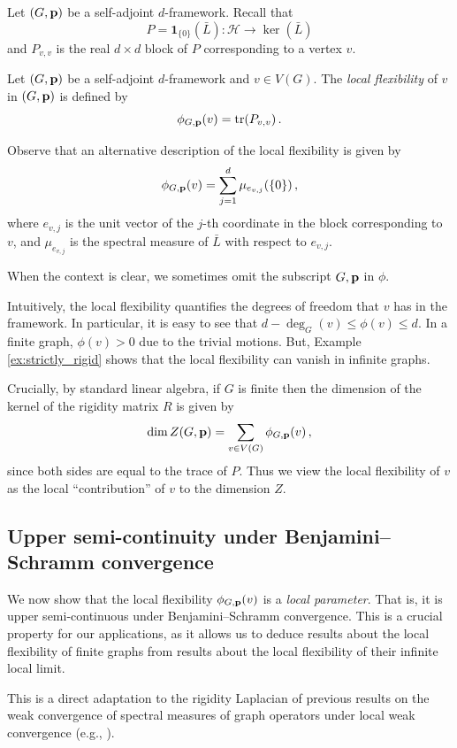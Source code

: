 \documentclass[reqno,english]{amsart}
\numberwithin{equation}{section}
\theoremstyle{definition}{
\newtheorem{example}[theorem]{Example}
\newtheorem{definition}[theorem]{Definition}
\newtheorem*{definition*}{Definition}
\newtheorem{problem}[theorem]{Problem}
\newtheorem{question}[theorem]{Question}
}
\newcommand{\cH}{\mathcal H}
\newcommand{\p}{{\bf p}}
\newcommand{\tr}{{\mathrm {tr}}}
\begin{document}
Let $(G,\p)$ be a self-adjoint $d$-framework. 
Recall that 
    \[
    P=\mathbf 1_{\{0\}}(\bar L):\cH\to \ker(\bar L)
    \]
    and $P_{v,v}$ is the real $d\times d$ block of $P$ corresponding to a vertex $v$. 
\begin{definition}
Let $(G,\p)$ be a self-adjoint $d$-framework and $v\in V(G)$. The {\em local flexibility} of $v$ in $(G,\p)$ is defined by
    \[
    \phi_{G,\p}(v)=\tr(P_{v,v})\,.
    \]
\end{definition}
Observe that an alternative description of the local flexibility is given by
\[
\phi_{G,\p}(v) = \sum_{j=1}^d \mu_{e_{v,j}}(\{0\})\,,
\]
where $e_{v,j}$ is the unit vector of the $j$-th coordinate in the block corresponding to $v$, and $\mu_{e_{v,j}}$ is the spectral measure of $\bar L$ with respect to $e_{v,j}$.

When the context is clear, we sometimes omit the subscript $G,\p$ in $\phi$.

Intuitively, the local flexibility quantifies the degrees of freedom that $v$ has in the framework. 
In particular, it is easy to see that $d-\deg_G(v)\le \phi (v)\le d$. In a finite graph, $\phi(v)>0$ due to the trivial motions. 
But, Example \ref{ex:strictly_rigid} shows that the local flexibility can vanish in infinite graphs.


Crucially, by standard linear algebra, if $G$ is finite then the dimension of the kernel of the rigidity matrix $R$ is given by
\begin{equation}\label{eq:dimZ_local}
\dim Z(G,\p) = \sum_{v\in V(G)} \phi_{G,\p}(v)\,,
\end{equation}
since both sides are equal to the trace of $P$. Thus we  view the local flexibility of $v$ as the local ``contribution'' of $v$ to the dimension $Z$.

\subsection{Upper semi-continuity under Benjamini--Schramm convergence}
We now show that the local flexibility $\phi_{G,\p}(v)$ is a {\em local parameter}. That is, it is upper semi-continuous 
under Benjamini--Schramm convergence. This is a crucial property for our applications, as it allows us to deduce results about the local flexibility of finite graphs from results about the local flexibility of their infinite local limit.

This is a direct adaptation to the rigidity Laplacian of previous results on the weak convergence of spectral measures of graph operators under local weak convergence (e.g., \cite{BordenaveLelargeSalezDiluted,AbertThomViragSpectralMeasure}).
\end{document}
